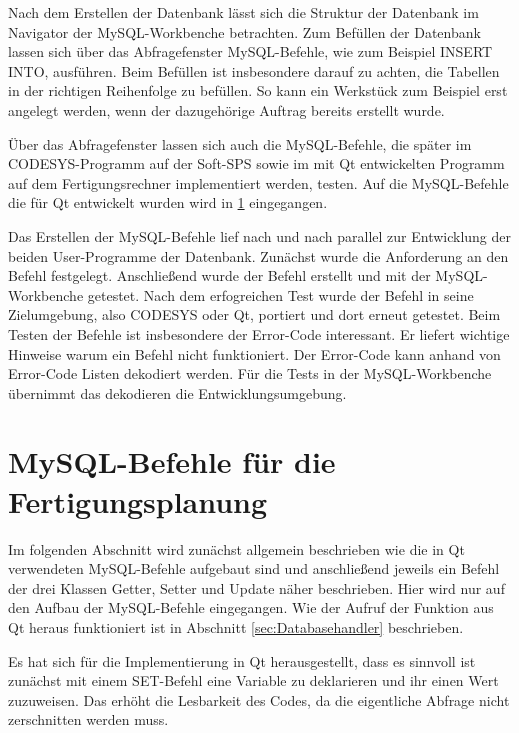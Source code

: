 Nach dem Erstellen der Datenbank lässt sich die Struktur der Datenbank im Navigator der MySQL-Workbenche betrachten. Zum Befüllen der Datenbank lassen sich über das Abfragefenster MySQL-Befehle, wie zum Beispiel \glqq INSERT INTO\grqq{},  ausführen. Beim Befüllen ist insbesondere darauf zu achten, die Tabellen in der richtigen Reihenfolge zu befüllen. So kann ein Werkstück zum Beispiel erst angelegt werden, wenn der dazugehörige Auftrag bereits erstellt wurde.
 
Über das Abfragefenster lassen sich auch die MySQL-Befehle, die später im CODE\-SYS-Programm auf der Soft-SPS sowie im mit Qt entwickelten Programm auf dem Fertigungsrechner implementiert werden, testen. Auf die MySQL-Befehle die für Qt entwickelt wurden wird in \ref{kap:MySQLBefehle} eingegangen. 

Das Erstellen der MySQL-Befehle lief nach und nach parallel zur Entwicklung der beiden User-Programme der Datenbank. Zunächst wurde die Anforderung an den Befehl festgelegt. Anschließend wurde der Befehl erstellt und mit der MySQL-Workbenche getestet. Nach dem erfogreichen Test wurde der Befehl in seine Zielumgebung, also CODESYS oder Qt, portiert und dort erneut getestet. Beim Testen der Befehle ist insbesondere der Error-Code interessant. Er liefert wichtige Hinweise warum ein Befehl nicht funktioniert. Der Error-Code kann anhand von Error-Code Listen dekodiert werden. Für die Tests in der MySQL-Workbenche übernimmt das dekodieren die Entwicklungsumgebung.

\section{MySQL-Befehle für die Fertigungsplanung}\label{kap:MySQLBefehle}
Im folgenden Abschnitt wird zunächst allgemein beschrieben wie die in Qt verwendeten MySQL-Befehle aufgebaut sind und anschließend jeweils ein Befehl der drei Klassen Getter, Setter und Update näher beschrieben. Hier wird nur auf den Aufbau der MySQL-Befehle eingegangen. Wie der Aufruf der Funktion aus Qt heraus funktioniert ist in Abschnitt \ref{sec:Databasehandler} beschrieben.

Es hat sich für die Implementierung in Qt herausgestellt, dass es sinnvoll ist zunächst mit einem SET-Befehl eine Variable zu deklarieren und ihr einen Wert zuzuweisen. Das erhöht die Lesbarkeit des Codes, da die eigentliche Abfrage nicht zerschnitten werden muss. 
